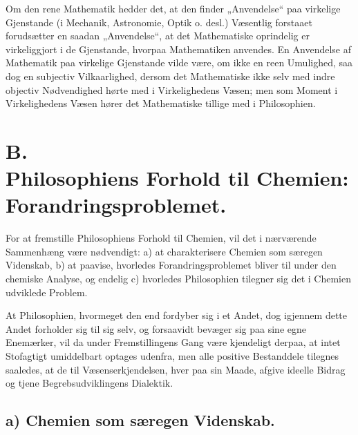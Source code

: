 \documentclass[12pt,a4paper]{book}
\begin{document}
Om den rene Mathematik hedder det, at den finder
„Anvendelse“ paa virkelige Gjenstande (i Mechanik, Astronomie,
Optik o. desl.) Væsentlig forstaaet forudsætter en saadan
„Anvendelse“, at det Mathematiske oprindelig er virkeliggjort
i de Gjenstande, hvorpaa Mathematiken anvendes. En Anvendelse
af Mathematik paa virkelige Gjenstande vilde være,
om ikke en reen Umulighed, saa dog en subjectiv Vilkaarlighed,
dersom det Mathematiske ikke selv med indre objectiv
Nødvendighed hørte med i Virkelighedens Væsen; men som
Moment i Virkelighedens Væsen hører det Mathematiske
tillige med i Philosophien.

\section*{B.\\ Philosophiens Forhold til Chemien:\\
Forandringsproblemet.}

For at fremstille Philosophiens Forhold til Chemien, vil
det i nærværende Sammenhæng være nødvendigt: a) at
charakterisere Chemien som særegen Videnskab, b) at paavise,
hvorledes Forandringsproblemet bliver til under den chemiske
Analyse, og endelig c) hvorledes Philosophien tilegner sig det
i Chemien udviklede Problem.

At Philosophien, hvormeget den end fordyber sig i et
Andet, dog igjennem dette Andet forholder sig til sig selv,
og forsaavidt bevæger sig paa sine egne Enemærker, vil
da under Fremstillingens Gang være kjendeligt derpaa, at
intet Stofagtigt umiddelbart optages udenfra, men alle positive
Bestanddele tilegnes saaledes, at de til Væsenserkjendelsen,
hver paa sin Maade, afgive ideelle Bidrag og tjene
Begrebsudviklingens Dialektik.

\subsection*{a) Chemien som særegen Videnskab.}
\end{document}
